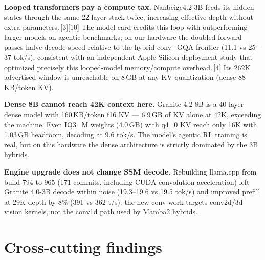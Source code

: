 \documentclass[10pt]{article}
\begin{document}
\textbf{Looped transformers pay a compute tax.} Nanbeige4.2-3B feeds its
hidden states through the same 22-layer stack twice, increasing effective
depth without extra parameters.\,[3][10] The model card credits this loop
with outperforming larger models on agentic benchmarks; on our hardware
the doubled forward passes halve decode speed relative to the hybrid
conv+GQA frontier (11.1 vs 25--37 tok/s), consistent with an independent
Apple-Silicon deployment study that optimized precisely this looped-model
memory/compute overhead.\,[4] Its 262K advertised window is unreachable
on 8\,GB at any KV quantization (dense 88\,KB/token KV).

\textbf{Dense 8B cannot reach 42K context here.} Granite 4.2-8B is a
40-layer dense model with 160\,KB/token f16 KV --- 6.9\,GB of KV alone at
42K, exceeding the machine. Even IQ3\_M weights (4.0\,GB) with q4\_0 KV
reach only 16K with 1.03\,GB headroom, decoding at 9.6 tok/s. The model's
agentic RL training is real, but on this hardware the dense architecture
is strictly dominated by the 3B hybrids.

\textbf{Engine upgrade does not change SSM decode.} Rebuilding llama.cpp
from build 794 to 965 (171 commits, including CUDA convolution
acceleration) left Granite 4.0-3B decode within noise (19.3--19.6 vs 19.5
tok/s) and improved prefill at 29K depth by 8\% (391 vs 362 t/s): the new
conv work targets conv2d/3d vision kernels, not the conv1d path used by
Mamba2 hybrids.

\section{Cross-cutting findings}
\end{document}
